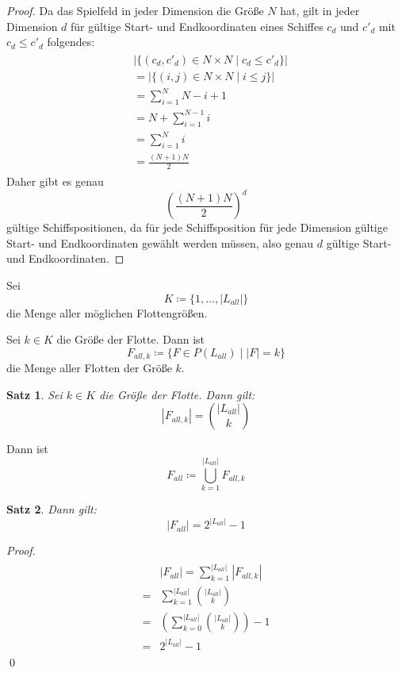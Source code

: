\documentclass[a4paper,12pt]{llncs}
\numberwithin{equation}{section}
\newtheorem{satz}{Satz}
\begin{document}
\begin{proof}
Da das Spielfeld in jeder Dimension die Größe $N$ hat, gilt in jeder Dimension $d$ für gültige Start- und Endkoordinaten eines Schiffes $c_d$ und $c'_d$ mit $c_d \leq c'_d$ folgendes:
\begin{align}
\begin{split}
&|\{(c_d, c'_d) \in N \times N \mid c_d \leq c'_d\}|\\
&=|\{(i, j) \in N \times N \mid i \leq j\}|\\
&=\sum_{i=1}^N N - i + 1\\
&=N + \sum_{i=1}^{N-1} i\\
&=\sum_{i=1}^{N} i\\
&= \frac{(N + 1) N}{2}
\nonumber
\end{split}
\end{align}
Daher gibt es genau
\[
\left(\frac{(N+1) N}{2}\right)^d
\]
gültige Schiffspositionen, da für jede Schiffsposition für jede Dimension gültige Start- und Endkoordinaten gewählt werden müssen, also genau $d$ gültige Start- und Endkoordinaten.
\end{proof}

\begin{definition}
Sei 
\[
K \coloneqq \{1, \dots, |L_{all}|\}
\]
die Menge aller möglichen Flottengrößen.
\end{definition}

\begin{definition}
Sei $k \in K$ die Größe der Flotte.
Dann ist
\[
F_{all,k} \coloneqq\{F \in P(L_{all}) \mid |F| = k\}
\]
die Menge aller Flotten der Größe $k$.
\end{definition}

\begin{satz}
Sei $k \in K$ die Größe der Flotte.
Dann gilt:
\[
|F_{all,k}|=\binom{|L_{all}|}{k}
\]
\end{satz}

\begin{definition}
Dann ist
\[
F_{all} \coloneqq \bigcup_{k=1}^{|L_{all}|} F_{all,k}
\]
\end{definition}

\begin{satz}
Dann gilt:
\[
|F_{all}|=2^{|L_{all}|} - 1
\]
\end{satz}

\begin{proof}
\begin{align}
\begin{split}
&|F_{all}|=\sum_{k=1}^{|L_{all}|} |F_{all,k}|\\
=&\sum_{k=1}^{|L_{all}|} \binom{|L_{all}|}{k} \\
=&\left( \sum_{k=0}^{|L_{all}|} \binom{|L_{all}|}{k} \right) - 1 \\
=&2^{|L_{all}|} - 1
\end{split}
\end{align}
\qed
\end{proof}
\end{document}
